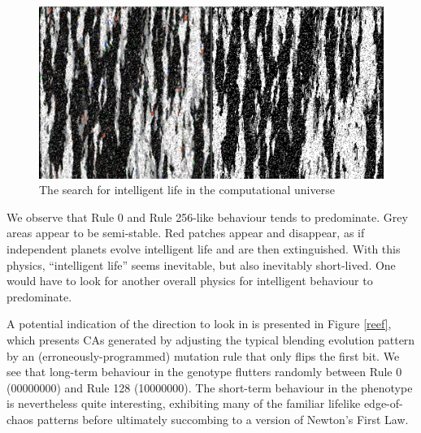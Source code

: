 \documentclass{AISB2008}
\begin{document}
\begin{figure}
\includegraphics[width=\columnwidth]{seti.png}
\caption{The search for intelligent life in the computational universe \label{seti}}
\end{figure}

We observe that Rule 0 and Rule 256-like behaviour tends to
predominate.  Grey areas appear to be semi-stable.  Red patches appear
and disappear, as if independent planets evolve intelligent life and
are then extinguished.  With this physics, ``intelligent life'' seems
inevitable, but also inevitably short-lived.  One would have to look
for another overall physics for intelligent behaviour to predominate.

A potential indication of the direction to look in is presented in
Figure \ref{reef}, which presents CAs generated by adjusting the
typical blending evolution pattern by an (erroneously-programmed)
mutation rule that only flips the first bit.  We see that long-term
behaviour in the genotype flutters randomly between Rule 0 (00000000)
and Rule 128 (10000000).  The short-term behaviour in the phenotype is
nevertheless quite interesting, exhibiting many of the familiar
lifelike edge-of-chaos patterns before ultimately succombing to a
version of Newton's First Law.
\end{document}
